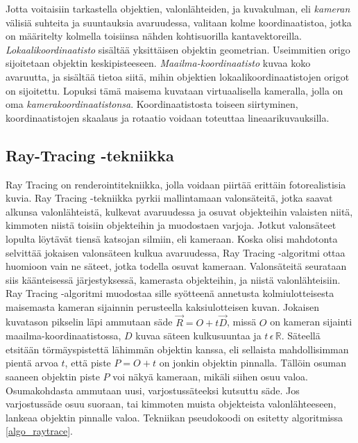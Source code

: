 \documentclass[a4paper,12pt, titlepage]{article}
\theoremstyle{break}
\newcommand{\R}{\mathbb{R}}
\begin{document}
Jotta voitaisiin tarkastella objektien, valonlähteiden, ja kuvakulman, eli \emph{kameran} välisiä suhteita ja suuntauksia avaruudessa, valitaan kolme koordinaatistoa, jotka on määritelty kolmella toisiinsa nähden kohtisuorilla kantavektoreilla. \emph{Lokaalikoordinaatisto} sisältää yksittäisen objektin geometrian. Useimmitien origo sijoitetaan objektin keskipisteeseen. \emph{Maailma-koordinaatisto} kuvaa koko avaruutta, ja sisältää tietoa siitä, mihin objektien lokaalikoordinaatistojen origot on sijoitettu. Lopuksi tämä maisema kuvataan virtuaalisella kameralla, jolla on oma \emph{kamerakoordinaatistonsa}. Koordinaatistosta toiseen siirtyminen, koordinaatistojen skaalaus ja rotaatio voidaan toteuttaa lineaarikuvauksilla.\cite{janke}

\subsection{Ray-Tracing -tekniikka}

Ray Tracing on renderointitekniikka, jolla voidaan piirtää erittäin fotorealistisia kuvia. Ray Tracing -tekniikka pyrkii mallintamaan valonsäteitä, jotka saavat alkunsa valonlähteistä, kulkevat avaruudessa ja osuvat objekteihin valaisten niitä, kimmoten niistä toisiin objekteihin ja muodostaen varjoja. Jotkut valonsäteet lopulta löytävät tiensä katsojan silmiin, eli kameraan. Koska olisi mahdotonta selvittää jokaisen valonsäteen kulkua avaruudessa, Ray Tracing -algoritmi ottaa huomioon vain ne säteet, jotka todella osuvat kameraan. Valonsäteitä seurataan siis käänteisessä järjestyksessä, kamerasta objekteihin, ja niistä valonlähteisiin.\cite{janke}\\

Ray Tracing -algoritmi muodostaa sille syötteenä annetusta kolmiulotteisesta maisemasta kameran sijainnin perusteella kaksiulotteisen kuvan. Jokaisen kuvatason pikselin läpi ammutaan säde $\vec{R}=O+t\vec{D}$, missä $O$ on kameran sijainti maailma-koordinaatistossa, $D$ kuvaa säteen kulkusuuntaa ja $t\,\epsilon\,\R$. Säteellä etsitään törmäyspistettä lähimmän objektin kanssa, eli sellaista mahdollisimman pientä arvoa $t$, että piste $P=O+t$ on jonkin objektin pinnalla. Tällöin osuman saaneen objektin piste $P$ voi näkyä kameraan, mikäli siihen osuu valoa. Osumakohdasta ammutaan uusi, varjostussäteeksi kutsuttu säde. Jos varjostussäde osuu suoraan, tai kimmoten muista objekteista valonlähteeseen, lankeaa objektin pinnalle valoa. Tekniikan pseudokoodi on esitetty algoritmissa \ref{algo_raytrace}.\cite{janke}\\
\end{document}
